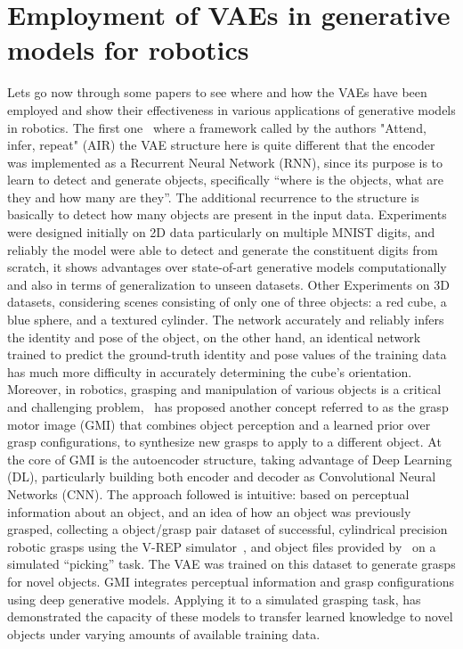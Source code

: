 \section{Employment of VAEs in generative models for robotics}
\label{sec:VAE_generative}
Lets go now through some papers to see where and how the VAEs have been employed and show their effectiveness in various applications of generative models in robotics. The first one~\cite{eslami2016attend} where a framework called by the authors "Attend, infer, repeat" (AIR) the VAE structure here is quite different that the encoder was implemented as a Recurrent Neural Network (RNN), since its purpose is to learn to detect and generate objects, specifically “where is the objects, what are they and how many are they”. The additional recurrence to the structure is basically to detect how many objects are present in the input data. Experiments were designed initially on 2D data particularly on multiple MNIST digits, and reliably the model were able to detect and generate the constituent digits from scratch, it shows advantages over state-of-art generative models computationally and also in terms of generalization to unseen datasets. Other Experiments on 3D datasets, considering scenes consisting of only one of three objects: a red cube, a blue sphere, and a textured cylinder. The network accurately and reliably infers the identity and pose of the object, on the other hand, an identical network trained to predict the ground-truth identity and pose values of the training data has much more difficulty in accurately determining the cube’s orientation.\\

Moreover, in robotics, grasping and manipulation of various objects is a critical and challenging problem,~\cite{veres2017modeling} has proposed another concept referred to as the grasp motor image (GMI) that combines object perception and a learned prior over grasp configurations, to synthesize new grasps to apply to a different object. At the core of GMI is the autoencoder structure, taking advantage of Deep  Learning (DL), particularly building both encoder and decoder as Convolutional Neural Networks (CNN). The approach followed is intuitive: based on
perceptual information about an object, and an idea of how an object was previously grasped, collecting a object/grasp pair dataset of successful, cylindrical precision robotic grasps using the V-REP  simulator~\cite{rohmer2013v}, and object files provided by~\cite{kleinhans2015g3db} on a simulated “picking” task. The VAE was trained on this dataset to generate grasps for novel objects. GMI integrates
perceptual information and grasp configurations using deep generative models. Applying it to a simulated grasping task, has demonstrated the capacity of these models to transfer learned knowledge to novel objects under varying amounts of available training data.\\

